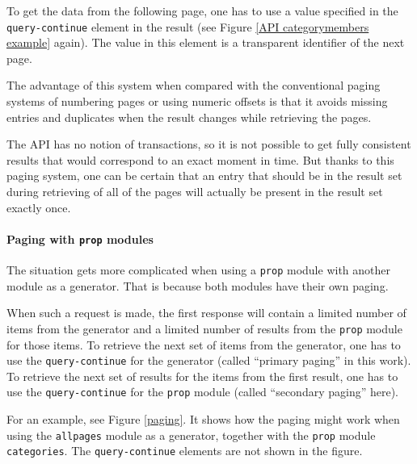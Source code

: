 To get the data from the following page, one has to use a value specified in the \texttt{query-continue}
element in the result (see Figure \ref{API categorymembers example} again).
The value in this element is a transparent identifier of the next page.

The advantage of this system when compared with the conventional paging systems of numbering pages
or using numeric offsets is that it avoids missing entries and duplicates when the result
changes while retrieving the pages.

The \ac{API} has no notion of transactions, so it is not possible to get fully consistent results
that would correspond to an exact moment in time.
But thanks to this paging system, one can be certain that an entry that should be in the result set
during retrieving of all of the pages will actually be present in the result set exactly once.

\paragraph{Paging with \texttt{prop} modules}

The situation gets more complicated when using a \texttt{prop} module with another module as a generator.
That is because both modules have their own paging.

When such a request is made, the first response will contain a limited number of items from the generator
and a limited number of results from the \texttt{prop} module for those items.
To retrieve the next set of items from the generator, one has to use the \texttt{query-continue} for the generator
(called “primary paging” in this work).
To retrieve the next set of results for the items from the first result,
one has to use the \texttt{query-continue} for the \texttt{prop} module (called “secondary paging” here).

For an example, see Figure \ref{paging}.
It shows how the paging might work when using the \texttt{allpages} module as a generator,
together with the \texttt{prop} module \texttt{categories}.
The \texttt{query-continue} elements are not shown in the figure.

